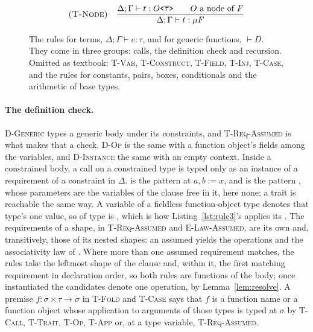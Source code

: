 \begin{figure}[htbp]
\[\begin{array}{@{}l@{\quad}l@{}}
\\[7pt]
\textsc{(T-Node)} & \dfrac{\Delta; \Gamma \vdash t : O\texttt{<}\overline{\tau}\texttt{>} \qquad O \text{ a node of } F}{\Delta; \Gamma \vdash t : \mu F}
\end{array}
\]
\caption{The rules for terms, $\Delta; \Gamma \vdash e : \tau$, and for generic functions, $\vdash D$.
They come in three groups: calls, the definition check and recursion.
Omitted as textbook: \textsc{T-Var}, \textsc{T-Construct}, \textsc{T-Field}, \textsc{T-Inj}, \textsc{T-Case}, and the rules for constants, pairs, boxes, conditionals and the arithmetic of base types.}
\label{fig:fjlt-typing}
\end{figure}

\paragraph{The definition check.}
\textsc{D-Generic} types a generic body under its constraints, and \textsc{T-Req-Assumed} is what makes that a check.
\textsc{D-Op} is the same with a function object's fields among the variables, and \textsc{D-Instance} the same with an empty context.
Inside a constrained body, a call on a constrained type is typed only as an instance of a requirement of a constraint in $\Delta$.
 is the pattern  at $a, b := x$, and  is the pattern , whose parameters are the variables of the  clause free in it, here none; a trait is reachable the same way.
A variable of a fieldless function-object type denotes that type's one value, so  of type  is , which is how Listing~\ref{lst:rule3}'s  applies its .
The requirements of a shape, in \textsc{T-Req-Assumed} and \textsc{E-Law-Assumed}, are its own and, transitively, those of its nested shapes: an assumed  yields the operations and the associativity law of .
Where more than one assumed requirement matches, the rules take the leftmost shape of the  clause and, within it, the first matching requirement in declaration order, so both rules are functions of the body; once instantiated the candidates denote one operation, by Lemma~\ref{lem:resolve}.
A premise $f : \sigma \times \tau \to \sigma$ in \textsc{T-Fold} and \textsc{T-Case} says that $f$ is a function name or a function object whose application to arguments of those types is typed at $\sigma$ by \textsc{T-Call}, \textsc{T-Trait}, \textsc{T-Op}, \textsc{T-App} or, at a type variable, \textsc{T-Req-Assumed}.

